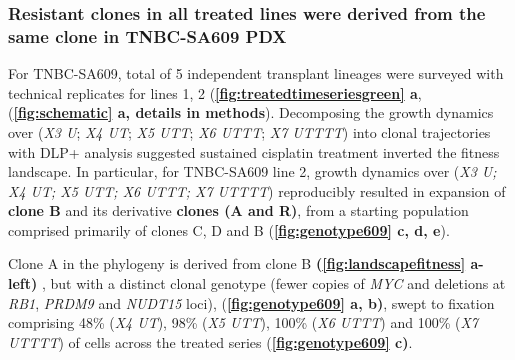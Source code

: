 \subsubsection{Resistant clones in all treated lines were derived from the same clone in TNBC-SA609 PDX}
For TNBC-SA609, total of 5 independent transplant lineages  were surveyed with technical replicates for lines 1, 2 (\textbf{\autoref{fig:treatedtimeseriesgreen} a}, (\textbf{\autoref{fig:schematic} a, details in methods}).
Decomposing the growth dynamics over (\textit{X3 U}; \textit{X4 UT}; \textit{X5 UTT}; \textit{X6 UTTT}; \textit{X7 UTTTT}) into clonal trajectories with DLP+ analysis suggested sustained cisplatin treatment inverted the fitness landscape. In particular, for TNBC-SA609 line 2, growth dynamics over (\textit{X3 U; X4 UT; X5 UTT; X6 UTTT; X7 UTTTT}) reproducibly resulted in expansion of \textbf{clone B} and its derivative \textbf{clones (A and R)}, from a starting population comprised primarily of clones C, D and B (\textbf{\autoref{fig:genotype609} c, d, e}).

Clone A in the phylogeny is derived from clone B \textbf{(\autoref{fig:landscapefitness} a-left)} , but with a distinct clonal genotype (fewer copies of \textit{MYC} and deletions at \textit{RB1}, \textit{PRDM9} and \textit{NUDT15} loci), (\textbf{\autoref{fig:genotype609} a, b)}, swept to fixation comprising 48\% (\textit{X4 UT}), 98\% (\textit{X5 UTT}), 100\% (\textit{X6 UTTT}) and 100\% (\textit{X7 UTTTT}) of cells across the treated series (\textbf{\autoref{fig:genotype609} c)}.





